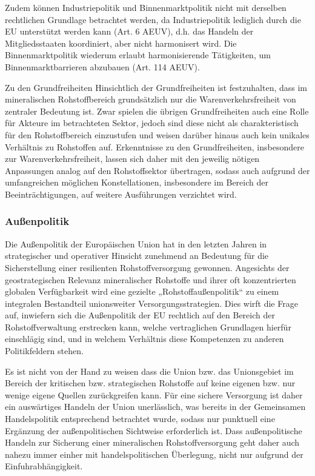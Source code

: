 \documentclass[12pt,a4paper,oneside]{book} %
\begin{document}
Zudem können Industriepolitik und Binnenmarktpolitik nicht mit derselben rechtlichen Grundlage betrachtet werden, da Industriepolitik lediglich durch die EU unterstützt werden kann (Art. 6 AEUV), d.h. das Handeln der Mitgliedsstaaten koordiniert, aber nicht harmonisert wird. Die Binnenmarktpolitik wiederum erlaubt harmonisierende Tätigkeiten, um Binnenmarktbarrieren abzubauen (Art. 114 AEUV).


Zu den Grundfreiheiten
Hinsichtlich der Grundfreiheiten ist festzuhalten, dass im mineralischen Rohstoffbereich grundsätzlich nur die Warenverkehrsfreiheit von zentraler Bedeutung ist. Zwar spielen die übrigen Grundfreiheiten auch eine Rolle für Akteure im betrachteten Sektor, jedoch sind diese nicht als charakteristisch für den Rohstoffbereich einzustufen und weisen darüber hinaus auch kein unikales Verhältnis zu Rohstoffen auf.\autocite[So auch]{Frau 2025, S. 395} Erkenntnisse zu den Grundfreiheiten, insbesondere zur Warenverkehrsfreiheit, lassen sich daher mit den jeweilig nötigen Anpassungen analog auf den Rohstoffsektor übertragen, sodass auch aufgrund der umfangreichen möglichen Konstellationen, insbesondere im Bereich der Beeinträchtigungen, auf weitere Ausführungen verzichtet wird.


	

	
\subsubsection{Außenpolitik}
Die Außenpolitik der Europäischen Union hat in den letzten Jahren in strategischer und operativer Hinsicht zunehmend an Bedeutung für die Sicherstellung einer resilienten Rohstoffversorgung gewonnen. Angesichts der geostrategischen Relevanz mineralischer Rohstoffe und ihrer oft konzentrierten globalen Verfügbarkeit wird eine gezielte „Rohstoffaußenpolitik“ zu einem integralen Bestandteil unionsweiter Versorgungsstrategien. Dies wirft die Frage auf, inwiefern sich die Außenpolitik der EU rechtlich auf den Bereich der Rohstoffverwaltung erstrecken kann, welche vertraglichen Grundlagen hierfür einschlägig sind, und in welchem Verhältnis diese Kompetenzen zu anderen Politikfeldern stehen.

Es ist nicht von der Hand zu weisen dass die Union bzw. das Unionsgebiet im Bereich der kritischen bzw. strategischen Rohstoffe auf keine eigenen bzw. nur wenige eigene Quellen zurückgreifen kann. Für eine sichere Versorgung ist daher ein auswärtiges Handeln der Union unerlässlich, was bereits in der Gemeinsamen Handelspolitik entsprechend betrachtet wurde, sodass nur punktuell eine Ergänzung der außenpolitischen Sichtweise erforderlich ist. Dass außenpolitische Handeln zur Sicherung einer mineralischen Rohstoffversorgung geht daher auch nahezu immer einher mit handelspolitischen Überlegung, nicht nur aufgrund der Einfuhrabhängigkeit.
\end{document}
